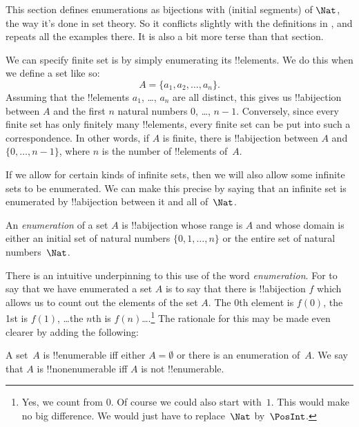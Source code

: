 \documentclass[../../../include/open-logic-section]{subfiles}
\begin{document}

\begin{editorial}
  This section defines enumerations as bijections with (initial
  segments) of $\Nat$, the way it's done in set theory. So it
  conflicts slightly with the definitions in , and
  repeats all the examples there. It is also a bit more terse than
  that section.
\end{editorial}

We can specify finite set is by simply enumerating its
!!{element}s. We do this when we define a set like so:
\[
  A = \{a_1, a_2, \ldots, a_n\}.
\]
Assuming that the !!{element}s $a_1$, \dots, $a_n$ are all distinct,
this gives us !!a{bijection} between $A$ and the first $n$ natural
numbers $0$, \dots, $n-1$. Conversely, since every finite set has only
finitely many !!{element}s, every finite set can be put into such a
correspondence. In other words, if $A$ is finite, there is
!!a{bijection} between $A$ and $\{0, \dots, n-1\}$, where $n$ is the
number of !!{element}s of~$A$.

If we allow for certain kinds of infinite sets, then we will also
allow some infinite sets to be enumerated. We can make this precise by
saying that an infinite set is enumerated by !!a{bijection} between it
and all of~$\Nat$.

\begin{defn} 
An \emph{enumeration} of a set $A$ is !!a{bijection} whose range is
$A$ and whose domain is either an initial set of natural numbers $\{0,
1, \ldots, n\}$ {or} the entire set of natural numbers~$\Nat$. 
\end{defn}

\begin{explain}
There is an intuitive underpinning to this use of the word
\emph{enumeration}. For to say that we have enumerated a set $A$ is to
say that there is !!a{bijection} $f$ which allows us to count out the
elements of the set $A$. The $0$th element is $f(0)$, the 1st is
$f(1)$, \ldots the $n$th is $f(n)$\ldots.\footnote{Yes, we count
from $0$. Of course we could also start with~$1$. This would
make no big difference. We would just have to replace~$\Nat$
by~$\PosInt$.} The rationale for this may be made even clearer by
adding the following:
\end{explain}

\begin{defn}
  A set~$A$ is !!{enumerable} iff either $A = \emptyset$ or there is
  an enumeration of~$A$. We say that $A$ is !!{nonenumerable} iff $A$
  is not !!{enumerable}.
\end{defn}
\end{document}
